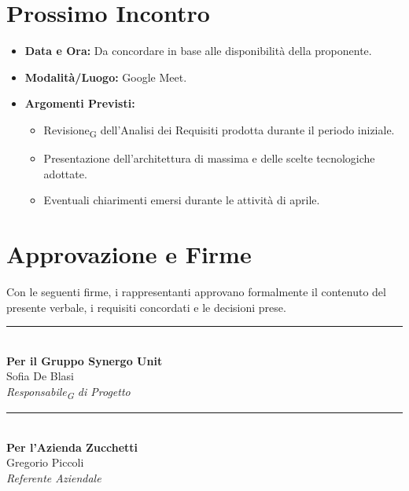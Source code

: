 \section{Prossimo Incontro}
 
\begin{itemize}
    \item \textbf{Data e Ora:} Da concordare in base alle disponibilità della proponente.
    \item \textbf{Modalità/Luogo:} Google Meet.
    \item \textbf{Argomenti Previsti:}
    \begin{itemize}
        \item Revisione\textsubscript{G} dell'Analisi dei Requisiti prodotta durante il periodo
              iniziale.
        \item Presentazione dell'architettura di massima e delle scelte
              tecnologiche adottate.
        \item Eventuali chiarimenti emersi durante le attività di aprile.
    \end{itemize}
\end{itemize}
 
\newpage
\section*{Approvazione e Firme}
Con le seguenti firme, i rappresentanti approvano formalmente il contenuto del presente verbale, i requisiti concordati e le decisioni prese.

\vspace{2.5cm}

\noindent
\begin{minipage}[c]{0.45\textwidth}
	\begin{center}
		\rule{6cm}{0.4pt} \\ 
		\vspace{0.2cm}
		\textbf{Per il Gruppo Synergo Unit} \\
		{Sofia De Blasi} \\
		\textit{Responsabile\textsubscript{G} di Progetto}
	\end{center}
\end{minipage}
\hfill
\begin{minipage}[c]{0.45\textwidth}
	\begin{center}
		\rule{6cm}{0.4pt} \\ 
		\vspace{0.2cm}
		\textbf{Per l'Azienda Zucchetti} \\
		{Gregorio Piccoli} \\
		\textit{Referente Aziendale}
	\end{center}
\end{minipage}

\vspace{2cm}

